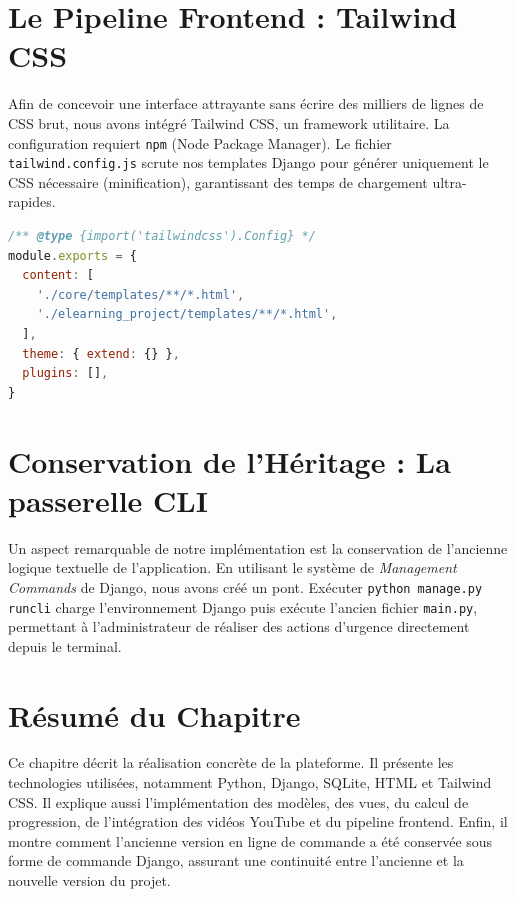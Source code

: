 \documentclass[12pt,a4paper]{report}
\begin{document}
\section{Le Pipeline Frontend : Tailwind CSS}
Afin de concevoir une interface attrayante sans écrire des milliers de lignes de CSS brut, nous avons intégré Tailwind CSS, un framework utilitaire.
La configuration requiert \texttt{npm} (Node Package Manager). Le fichier \texttt{tailwind.config.js} scrute nos templates Django pour générer uniquement le CSS nécessaire (minification), garantissant des temps de chargement ultra-rapides.

\begin{lstlisting}[language=JavaScript, caption=Configuration de Tailwind scrutant les templates Django]
/** @type {import('tailwindcss').Config} */
module.exports = {
  content: [
    './core/templates/**/*.html',
    './elearning_project/templates/**/*.html',
  ],
  theme: { extend: {} },
  plugins: [],
}
\end{lstlisting}

\section{Conservation de l'Héritage : La passerelle CLI}
Un aspect remarquable de notre implémentation est la conservation de l'ancienne logique textuelle de l'application. En utilisant le système de \textit{Management Commands} de Django, nous avons créé un pont. Exécuter \texttt{python manage.py runcli} charge l'environnement Django puis exécute l'ancien fichier \texttt{main.py}, permettant à l'administrateur de réaliser des actions d'urgence directement depuis le terminal.

\vspace{0.5cm}

\section*{Résumé du Chapitre}

Ce chapitre décrit la réalisation concrète de la plateforme. Il présente les technologies utilisées, notamment Python, Django, SQLite, HTML et Tailwind CSS. Il explique aussi l’implémentation des modèles, des vues, du calcul de progression, de l’intégration des vidéos YouTube et du pipeline frontend. Enfin, il montre comment l’ancienne version en ligne de commande a été conservée sous forme de commande Django, assurant une continuité entre l’ancienne et la nouvelle version du projet.
\end{document}
